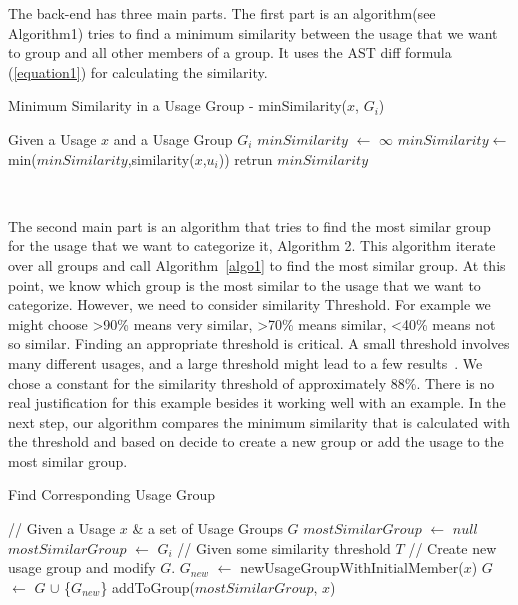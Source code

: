 \documentclass[conference]{IEEEtran}
\begin{document}
The back-end has three main parts. The first part is an algorithm(see Algorithm1) tries to find a minimum similarity between the usage that we want to group and all other members of a group. It uses the AST diff formula (\ref{equation1}) for calculating the similarity.\par

\begin{algorithm}
\label{algo1}
    \caption{Minimum Similarity in a Usage Group - minSimilarity($x$, $G_{i}$)} 
    \begin{algorithmic}[1]
    \State Given a Usage $x$ and a Usage Group $G_{i}$
    \State $minSimilarity$ $\leftarrow$ $\infty$
    \State $minSimilarity$$\leftarrow$min($minSimilarity$,similarity($x$,$u_{i}$)) \EndFor
   \State retrun $minSimilarity$
    \end{algorithmic} 
     \
\end{algorithm}

The second main part is an algorithm that tries to find the most similar group for the usage that we want to categorize it, Algorithm 2. This algorithm iterate over all groups and call Algorithm~\ref{algo1} to find the most similar group. At this point, we know which group is the most similar to the usage that we want to categorize. However, we need to consider similarity Threshold. For example we might choose \textgreater 90\% means very similar, \textgreater 70\% means similar, \textless 40\% means not so similar. Finding an appropriate threshold is critical. A small threshold involves many different usages, and a large threshold might lead to a few results~\cite{deng2013top}. We chose a constant for the similarity threshold of approximately 88\%. There is no real justification for this example besides it working well with an example. In the next step, our algorithm compares the minimum similarity that is calculated with the threshold and based on decide to create a new group or add the usage to the most similar group. 

\begin{algorithm}
\label{algo2}
    \caption{Find Corresponding Usage Group} 
    \begin{algorithmic}[1]
    \State // Given a Usage $x$ \& a set of Usage Groups $G$
    \State $mostSimilarGroup$ $\leftarrow$ $null$
    \State $mostSimilarGroup$ $\leftarrow$ $G_{i}$
    \EndIf
    \EndFor
    \State // Given some similarity threshold $T$
        \State // Create new usage group and modify $G$.
        \State $G_{new}$ $\leftarrow$ newUsageGroupWithInitialMember($x$)
        \State $G$ $\leftarrow$ $G$ $\cup$ \{$G_{new}$\}
    \Else
    \State addToGroup($mostSimilarGroup$, $x$)
    \EndIf
    \end{algorithmic} 
\end{algorithm}
\end{document}
